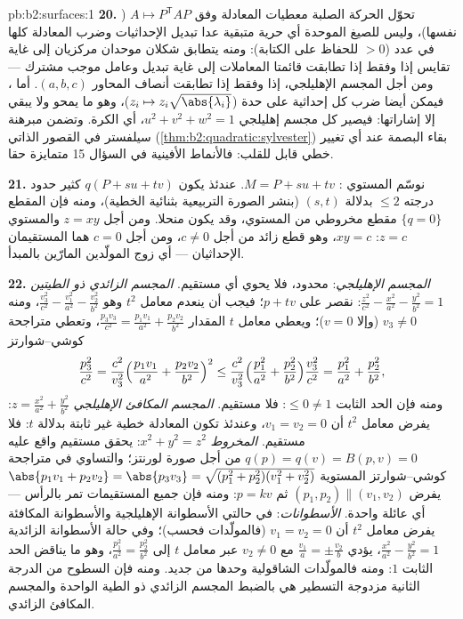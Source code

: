 \begin{solution}{pb:b2:surfaces:1}
\textbf{20.} تحوّل الحركة الصلبة معطيات المعادلة وفق $A \mapsto P^{\mathsf T}\!AP$ ( نفسها)، وليس للصيغ الموحدة أي حرية متبقية عدا تبديل
الإحداثيات وضرب المعادلة كلها في عدد ($> 0$ للحفاظ على الكتابة):
ومنه يتطابق شكلان موحدان مركزيان إلى غاية تقايس إذا وفقط إذا تطابقت
قائمتا المعاملات إلى غاية تبديل وعامل موجب مشترك --- ومن أجل المجسم
الإهليلجي، إذا وفقط إذا تطابقت أنصاف المحاور $(a, b, c)$. أما ،
فيمكن أيضا ضرب كل إحداثية على حدة ($z_i \mapsto z_i\sqrt{\abs
{\lambda_i}}$)، وهو ما يمحو  ولا يبقي إلا إشاراتها: فيصير كل مجسم إهليلجي $u^2 + v^2 + w^2 = 1$، أي
الكرة. وتضمن مبرهنة سيلفستر في القصور الذاتي (\cref{thm:b2:quadratic:sylvester}) بقاء البصمة
عند أي تغيير خطي قابل للقلب: فالأنماط الأفينية في السؤال 15 متمايزة
حقا.

\textbf{21.} نوسّم المستوي : $M = P + su +
tv$. عندئذ يكون $q(P + su + tv)$ كثير
حدود درجته $\leq 2$ بدلالة $(s, t)$ (بنشر الصورة التربيعية بثنائية
الخطية)، ومنه فإن المقطع $\{q = 0\}$ مقطع مخروطي من المستوي، وقد يكون
منحلا. ومن أجل $z = xy$ والمستوي $z = c$: $xy = c$، وهو قطع زائد من أجل
$c \neq 0$، ومن أجل $c = 0$ هما المستقيمان الإحداثيان --- أي زوج
المولّدين المارّين بالمبدأ.

\textbf{22.} \emph{المجسم الإهليلجي}: محدود، فلا يحوي أي مستقيم.
\emph{المجسم الزائدي ذو الطيتين} $\frac{z^2}{c^2} -
\frac{x^2}{a^2} - \frac{y^2}{b^2} = 1$: نقصر على $p + tv$؛ فيجب أن
ينعدم معامل $t^2$ وهو $\frac{v_3^2}{c^2} - \frac{v_1^2}{a^2}
- \frac{v_2^2}{b^2}$، ومنه $v_3 \neq 0$ (وإلا $v =
0$)؛ ويعطي
معامل $t$ المقدار $\frac{p_3v_3}{c^2} =
\frac{p_1v_1}{a^2} + \frac{p_2v_2}{b^2}$، وتعطي متراجحة كوشي--شوارتز
\[
\frac{p_3^2}{c^2}
= \frac{c^2}{v_3^2}\Bigl(\frac{p_1v_1}{a^2} +
\frac{p_2v_2}{b^2}\Bigr)^2
\leq \frac{c^2}{v_3^2}\Bigl(\frac{p_1^2}{a^2} +
\frac{p_2^2}{b^2}\Bigr)\frac{v_3^2}{c^2}
= \frac{p_1^2}{a^2} + \frac{p_2^2}{b^2},
\]
ومنه فإن الحد الثابت $\leq 0 \neq 1$: فلا مستقيم.
\emph{المجسم المكافئ الإهليلجي} $z = \frac{x^2}{a^2} +
\frac{y^2}{b^2}$: يفرض معامل $t^2$ أن $v_1 = v_2 =
0$،
وعندئذ تكون المعادلة خطية غير ثابتة بدلالة $t$: فلا مستقيم.
\emph{المخروط} $x^2 + y^2 = z^2$: يحقق مستقيم واقع عليه $q(p) =
q(v) = B(p, v) = 0$ من أجل صورة
لورنتز؛ والتساوي في متراجحة كوشي--شوارتز المستوية $\abs{p_1v_1 + p_2v_2} = \abs{p_3v_3} =
\sqrt{(p_1^2 + p_2^2)(v_1^2 + v_2^2)}$ يفرض $(p_1, p_2)
\parallel (v_1, v_2)$
ثم $p = kv$: ومنه فإن جميع المستقيمات تمر بالرأس --- أي عائلة واحدة.
\emph{الأسطوانات}: في حالتي الأسطوانة الإهليلجية والأسطوانة المكافئة
يفرض معامل $t^2$ أن $v_1 = v_2 = 0$ (فالمولّدات فحسب)؛ وفي حالة الأسطوانة
الزائدية $\frac{x^2}{a^2} - \frac{y^2}{b^2} = 1$، يؤدي $\frac{v_1}a = \pm
\frac{v_2}b$ مع $v_2 \neq 0$ عبر معامل $t$ إلى
$\frac{p_1^2}{a^2} = \frac{p_2^2}{b^2}$، وهو ما يناقض الحد الثابت $1$: ومنه فالمولّدات الشاقولية
وحدها من جديد. ومنه فإن السطوح من الدرجة الثانية مزدوجة التسطير هي
بالضبط المجسم الزائدي ذو الطية الواحدة والمجسم المكافئ الزائدي.


\end{solution}
